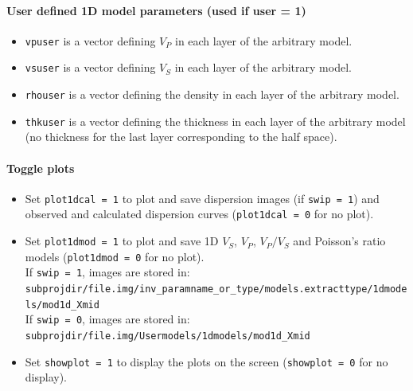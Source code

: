 \documentclass[twoside,a4paper]{article}
\begin{document}
\paragraph{User defined 1D model parameters (used if user = 1)}
\begin{itemize}[leftmargin=*]
\setlength\itemsep{2ex}
\item \verb|vpuser| is a vector defining $V_P$ in each layer of the arbitrary model.
\item \verb|vsuser| is a vector defining $V_S$ in each layer of the arbitrary model.
\item \verb|rhouser| is a vector defining the density in each layer of the arbitrary model.
\item \verb|thkuser| is a vector defining the thickness in each layer of the arbitrary model (no thickness for the last layer corresponding to the half space).
\end{itemize}

\paragraph{Toggle plots}
\begin{itemize}[leftmargin=*]
\setlength\itemsep{2ex}
\item Set \verb|plot1dcal = 1| to plot and save dispersion images (if \verb|swip = 1|) and observed and calculated dispersion curves (\verb|plot1dcal = 0| for no plot).

\item Set \verb|plot1dmod = 1| to plot and save 1D $V_S$, $V_P$, $V_P/V_S$ and Poisson's ratio models (\verb|plot1dmod = 0| for no plot).\\[1ex]
If \verb|swip = 1|, images are stored in:\\
\verb|subprojdir/file.img/inv_paramname_or_type/models.extracttype/1dmodels/mod1d_Xmid|\\[1ex]
If \verb|swip = 0|, images are stored in:\\
\verb|subprojdir/file.img/Usermodels/1dmodels/mod1d_Xmid|

\item Set \verb|showplot = 1| to display the plots on the screen (\verb|showplot = 0| for no display).
\end{itemize}
\end{document}
